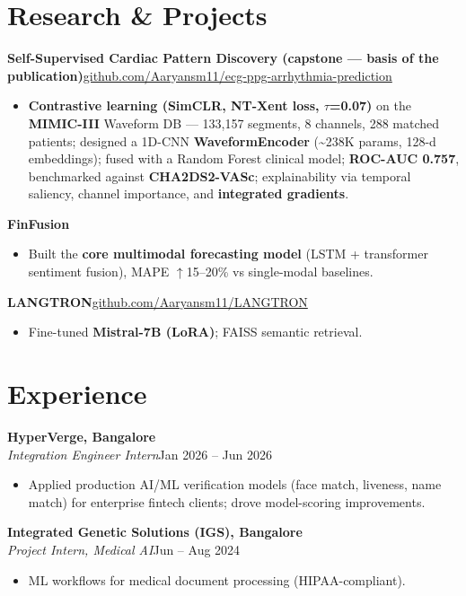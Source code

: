 \documentclass[10pt,a4paper]{article}
\begin{document}
\section*{Research \& Projects}
\vspace{1pt}\textbf{Self-Supervised Cardiac Pattern Discovery (capstone --- basis of the publication)}\hfill {\small\href{https://github.com/Aaryansm11/ecg-ppg-arrhythmia-prediction}{github.com/Aaryansm11/ecg-ppg-arrhythmia-prediction}}
\begin{itemize}
\item \textbf{Contrastive learning (SimCLR, NT-Xent loss, $\tau$=0.07)} on the \textbf{MIMIC-III} Waveform DB --- 133,157 segments, 8 channels, 288 matched patients; designed a 1D-CNN \textbf{WaveformEncoder} (\textasciitilde{}238K params, 128-d embeddings); fused with a Random Forest clinical model; \textbf{ROC-AUC 0.757}, benchmarked against \textbf{CHA2DS2-VASc}; explainability via temporal saliency, channel importance, and \textbf{integrated gradients}.
\end{itemize}
\vspace{1pt}\textbf{FinFusion}
\begin{itemize}
\item Built the \textbf{core multimodal forecasting model} (LSTM + transformer sentiment fusion), MAPE $\uparrow$15--20\% vs single-modal baselines.
\end{itemize}
\vspace{1pt}\textbf{LANGTRON}\hfill {\small\href{https://github.com/Aaryansm11/LANGTRON}{github.com/Aaryansm11/LANGTRON}}
\begin{itemize}
\item Fine-tuned \textbf{Mistral-7B (LoRA)}; FAISS semantic retrieval.
\end{itemize}
\section*{Experience}
\vspace{1pt}\textbf{HyperVerge, Bangalore}\\
\textit{Integration Engineer Intern}\hfill Jan 2026 -- Jun 2026\par\vspace{1pt}
\begin{itemize}
\item Applied production AI/ML verification models (face match, liveness, name match) for enterprise fintech clients; drove model-scoring improvements.
\end{itemize}
\vspace{1pt}\textbf{Integrated Genetic Solutions (IGS), Bangalore}\\
\textit{Project Intern, Medical AI}\hfill Jun -- Aug 2024\par\vspace{1pt}
\begin{itemize}
\item ML workflows for medical document processing (HIPAA-compliant).
\end{itemize}
\end{document}
